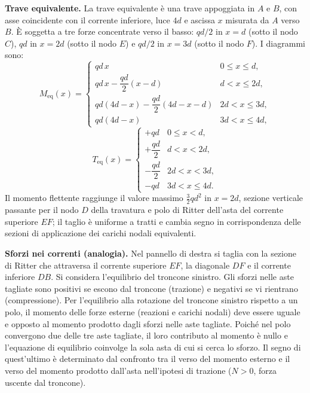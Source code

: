 \begin{esempio}
\begin{svolgimento}
		\noindent\textbf{Trave equivalente.}
		La trave equivalente è una trave appoggiata in $A$
		e $B$, con asse coincidente con il corrente inferiore,
		luce $4d$ e ascissa $x$ misurata da $A$ verso $B$.
		È soggetta a tre forze concentrate verso il basso:
		$qd/2$ in $x=d$ (sotto il nodo $C$),
		$qd$ in $x=2d$ (sotto il nodo $E$) e
		$qd/2$ in $x=3d$ (sotto il nodo $F$).
		I diagrammi sono:
		\[
		M_\text{eq}(x) = \begin{cases}
			qd \, x & 0 \leq x \leq d, \\
			qd \, x - \dfrac{qd}{2}(x-d) & d < x \leq 2d, \\
			qd(4d-x) - \dfrac{qd}{2}(4d-x-d) & 2d < x \leq 3d, \\
			qd(4d - x) & 3d < x \leq 4d,
		\end{cases}
		\]
		\[
		T_\text{eq}(x) = \begin{cases}
			+qd & 0 \leq x < d, \\
			+\dfrac{qd}{2} & d < x < 2d, \\
			-\dfrac{qd}{2} & 2d < x < 3d, \\
			-qd & 3d < x \leq 4d.
		\end{cases}
		\]
		Il momento flettente raggiunge il valore massimo
		$\tfrac{3}{2}qd^2$ in $x = 2d$, sezione verticale
		passante per il nodo  $D$ della travatura e polo
		di Ritter dell'asta del corrente superiore  $EF$;
		il taglio è uniforme a tratti e cambia segno
		in corrispondenza delle sezioni di applicazione
		dei carichi nodali equivalenti.
		
		\noindent\textbf{Sforzi nei correnti (analogia).}
		Nel pannello di destra si taglia con la sezione
		di Ritter che attraversa il corrente superiore
		$EF$, la diagonale $DF$ e il corrente inferiore
		$DB$. Si considera l'equilibrio del troncone
		sinistro. Gli sforzi nelle aste tagliate sono
		positivi se escono dal troncone (trazione) e
		negativi se vi rientrano (compressione).
		Per l'equilibrio alla rotazione del troncone
		sinistro rispetto a un polo, il momento delle
		forze esterne (reazioni e carichi nodali) deve
		essere uguale e opposto al momento prodotto dagli
		sforzi nelle aste tagliate. Poiché nel polo
		convergono due delle tre aste tagliate, il loro
		contributo al momento è nullo e l'equazione di
		equilibrio coinvolge la sola asta di cui si cerca
		lo sforzo. Il segno di quest'ultimo è determinato
		dal confronto tra il verso del momento esterno
		e il verso del momento prodotto dall'asta
		nell'ipotesi di trazione ($N > 0$, forza uscente
		dal troncone).
		

\end{svolgimento}
\end{esempio}
